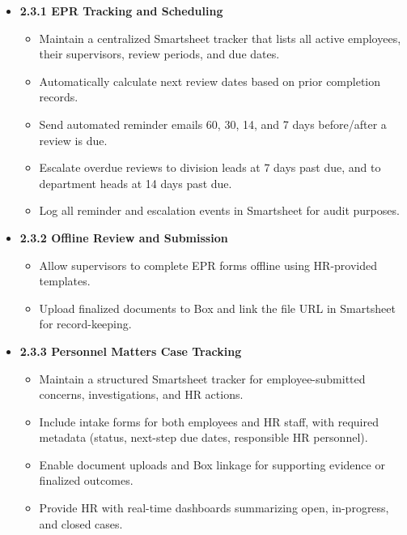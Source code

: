 \documentclass[12pt]{article}
\begin{document}
\begin{itemize}
  \item \textbf{2.3.1 EPR Tracking and Scheduling}
  \begin{itemize}
    \item Maintain a centralized Smartsheet tracker that lists all active employees, their supervisors, review periods, and due dates.
    \item Automatically calculate next review dates based on prior completion records.
    \item Send automated reminder emails 60, 30, 14, and 7 days before/after a review is due.
    \item Escalate overdue reviews to division leads at 7 days past due, and to department heads at 14 days past due.
    \item Log all reminder and escalation events in Smartsheet for audit purposes.
  \end{itemize}

  \item \textbf{2.3.2 Offline Review and Submission}
  \begin{itemize}
    \item Allow supervisors to complete EPR forms offline using HR-provided templates.
    \item Upload finalized documents to Box and link the file URL in Smartsheet for record-keeping.
  \end{itemize}

\item \textbf{2.3.3 Personnel Matters Case Tracking}
  \begin{itemize}
    \item Maintain a structured Smartsheet tracker for employee-submitted concerns, investigations, and HR actions.
    \item Include intake forms for both employees and HR staff, with required metadata (status, next-step due dates, responsible HR personnel).
    \item Enable document uploads and Box linkage for supporting evidence or finalized outcomes.
    \item Provide HR with real-time dashboards summarizing open, in-progress, and closed cases.
  \end{itemize}
  

\end{itemize}
\end{document}
